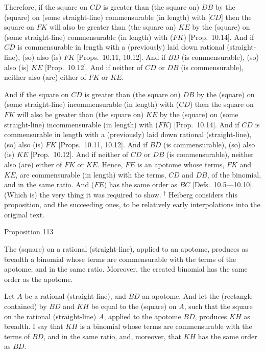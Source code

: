   Therefore, if the square on $CD$ is greater than (the square on) $DB$
  by the (square) on (some straight-line) commensurable  (in length) with [$CD$]  then the square on $FK$ will also be greater than (the square on) $KE$
  by the (square) on (some straight-line) commensurable  (in length) with ($FK$) [Prop.~10.14]. And if $CD$ is commensurable in length with a (previously) laid down rational (straight-line), (so) also (is) $FK$ [Props.~10.11, 10.12]. And if $BD$ (is commensurable), (so) also (is) $KE$ [Prop.~10.12]. And if neither of
  $CD$ or $DB$ (is commensurable), neither also (are) either of $FK$ or $KE$.
  
And if the square on $CD$ is greater than (the square on) $DB$
  by the (square) on (some straight-line) incommensurable  (in length) with ($CD$)  then the square on $FK$ will also be greater than (the square on) $KE$
  by the (square) on (some straight-line) incommensurable  (in length) with ($FK$) [Prop.~10.14]. And if $CD$ is commensurable in length with a (previously) laid down rational (straight-line), (so) also  (is) $FK$ [Props.~10.11, 10.12]. And if $BD$ (is commensurable), (so) also (is) $KE$ [Prop.~10.12]. And if neither of
  $CD$ or $DB$ (is commensurable), neither also (are) either of $FK$ or $KE$.
  Hence, $FE$ is an apotome whose terms, $FK$ and $KE$, are
  commensurable (in length) with the terms, $CD$ and $DB$, of the binomial,
  and in the same ratio. And ($FE$) has the same order as $BC$ [Defs.~10.5---10.10]. 
  (Which is) the very thing it was required to show.
{\footnotesize\noindent$^\dag$ Heiberg considers this proposition, and
the succeeding ones, to be  relatively early interpolations into the original
text.}


\begin{center}
{\large Proposition 113}
\end{center}

The (square) on a rational (straight-line),
applied to an apotome, produces as breadth a binomial whose terms
are commensurable with the terms of the apotome, and in  the same ratio.
Moreover, the created binomial has the same order as the apotome.

\epsfysize=0.9in
\centerline{}

Let $A$ be a rational (straight-line), and $BD$ an apotome. And let the
(rectangle contained) by $BD$ and $KH$ be equal to the (square) on $A$,
such that the square on the rational (straight-line) $A$, applied to the apotome
$BD$, produces $KH$ as breadth. I say that $KH$ is a binomial whose
terms are commensurable with the terms of $BD$, and in the same ratio, and,
moreover, that $KH$ has the same order as $BD$.

